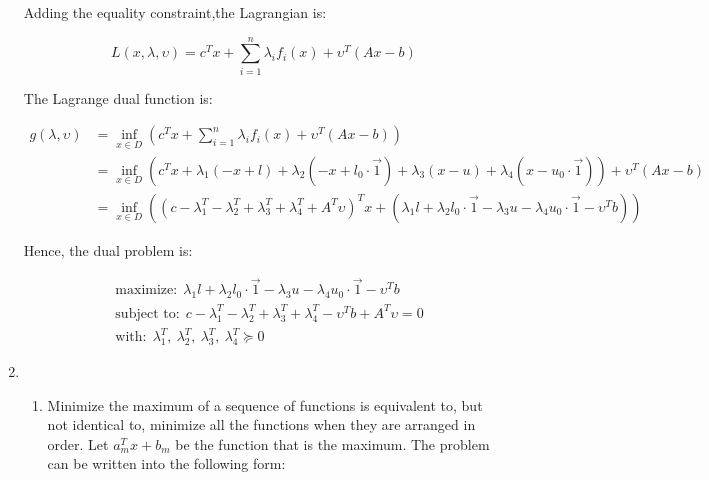 \documentclass[11pt, letterpaper, titlepage]{article}
\begin{document}
\begin{enumerate}
    Adding the equality constraint,the Lagrangian is:
    
    \begin{equation*}
        L(x, \lambda, \upsilon) = c^T x + \sum_{i = 1}^{n} \lambda_i f_i (x) + \upsilon^T (A x - b)
    \end{equation*}
    
    The Lagrange dual function is:
    
    \begin{equation*}
        \begin{aligned}
            g(\lambda, \upsilon) &= \inf_{x \in D} (c^T x + \sum_{i = 1}^{n} \lambda_i f_i (x) + \upsilon^T (A x - b)) \\
            &= \inf_{x \in D} (c^T x + \lambda_1(- x + l) + \lambda_2(- x + l_0 \cdot \Vec{1}) + \lambda_3(x - u) + \lambda_4(x - u_0 \cdot \Vec{1})) + \upsilon^T (A x - b) \\
            &= \inf_{x \in D} ((c - \lambda_1^T - \lambda_2^T + \lambda_3^T + \lambda_4^T + A^T \upsilon)^T x + (\lambda_1 l + \lambda_2 l_0 \cdot \Vec{1} - \lambda_3 u - \lambda_4 u_0 \cdot \Vec{1} - \upsilon^T b))
        \end{aligned}
    \end{equation*}
    
    Hence, the dual problem is:
    
    \begin{equation*}
        \begin{aligned}
            &\text{maximize:} \ \ \lambda_1 l + \lambda_2 l_0 \cdot \Vec{1} - \lambda_3 u - \lambda_4 u_0 \cdot \Vec{1} - \upsilon^T b \\
            &\text{subject to:} \ \ c - \lambda_1^T - \lambda_2^T + \lambda_3^T + \lambda_4^T - \upsilon^T b + A^T \upsilon = 0 \\
            &\text{with:} \ \  \lambda_1^T, \ \lambda_2^T, \ \lambda_3^T, \ \lambda_4^T \succeq 0
        \end{aligned}
    \end{equation*}
    
    \item %
    
    \begin{enumerate}
        
        \item %
        
        Minimize the maximum of a sequence of functions is equivalent to, but not identical to, minimize all the functions when they are arranged in order. Let $a_m^T x + b_m$ be the function that is the maximum. The problem can be written into the following form:
        

\end{enumerate}
\end{enumerate}
\end{document}
